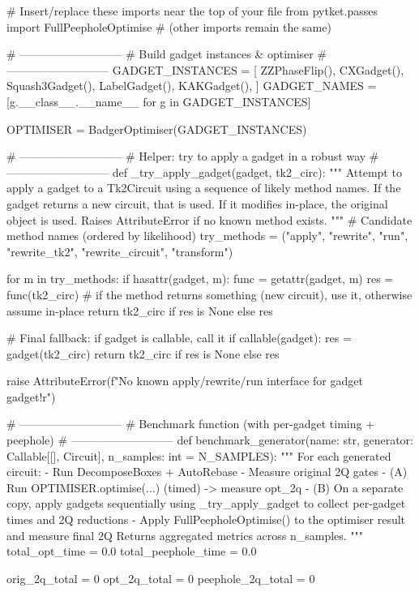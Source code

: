 # Insert/replace these imports near the top of your file
from pytket.passes import FullPeepholeOptimise
# (other imports remain the same)

# ---------------------------
# Build gadget instances & optimiser
# ---------------------------
GADGET_INSTANCES = [
    ZZPhaseFlip(),
    CXGadget(),
    Squash3Gadget(),
    LabelGadget(),
    KAKGadget(),
]
GADGET_NAMES = [g.__class__.__name__ for g in GADGET_INSTANCES]

OPTIMISER = BadgerOptimiser(GADGET_INSTANCES)

# ---------------------------
# Helper: try to apply a gadget in a robust way
# ---------------------------
def _try_apply_gadget(gadget, tk2_circ):
    """
    Attempt to apply a gadget to a Tk2Circuit using a sequence of likely method names.
    If the gadget returns a new circuit, that is used. If it modifies in-place, the
    original object is used. Raises AttributeError if no known method exists.
    """
    # Candidate method names (ordered by likelihood)
    try_methods = ("apply", "rewrite", "run", "rewrite_tk2", "rewrite_circuit", "transform")

    for m in try_methods:
        if hasattr(gadget, m):
            func = getattr(gadget, m)
            res = func(tk2_circ)
            # if the method returns something (new circuit), use it, otherwise assume in-place
            return tk2_circ if res is None else res

    # Final fallback: if gadget is callable, call it
    if callable(gadget):
        res = gadget(tk2_circ)
        return tk2_circ if res is None else res

    raise AttributeError(f"No known apply/rewrite/run interface for gadget {gadget!r}")

# ---------------------------
# Benchmark function (with per-gadget timing + peephole)
# ---------------------------
def benchmark_generator(name: str, generator: Callable[[], Circuit], n_samples: int = N_SAMPLES):
    """
    For each generated circuit:
      - Run DecomposeBoxes + AutoRebase
      - Measure original 2Q gates
      - (A) Run OPTIMISER.optimise(...) (timed) -> measure opt_2q
      - (B) On a separate copy, apply gadgets sequentially using _try_apply_gadget to
            collect per-gadget times and 2Q reductions
      - Apply FullPeepholeOptimise() to the optimiser result and measure final 2Q
    Returns aggregated metrics across n_samples.
    """
    total_opt_time = 0.0
    total_peephole_time = 0.0

    orig_2q_total = 0
    opt_2q_total = 0
    peephole_2q_total = 0

